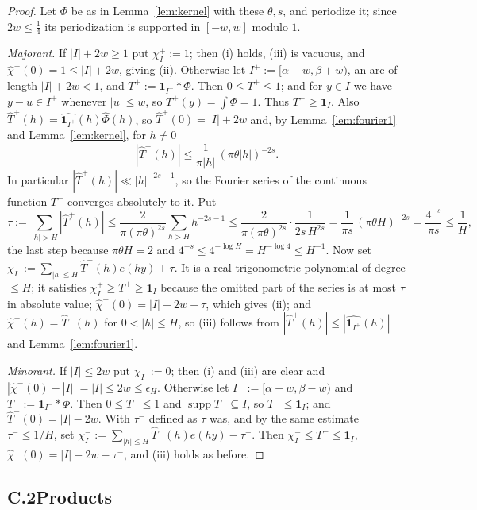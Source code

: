 \documentclass[11pt]{article}
\theoremstyle{definition}
\theoremstyle{plain}
\begin{document}
\begin{proof}
Let $\Phi$ be as in Lemma~\ref{lem:kernel} with these $\theta,s$, and
periodize it; since $2w\le\tfrac14$ its periodization is supported in
$[-w,w]$ modulo $1$.

\emph{Majorant.}  If $|I|+2w\ge1$ put $\chi^{+}_{I}:=1$; then (i) holds,
(iii) is vacuous, and $\hat\chi^{+}(0)=1\le|I|+2w$, giving (ii).
Otherwise let $I^{+}:=[\alpha-w,\beta+w)$, an arc of length $|I|+2w<1$,
and $T^{+}:=\mathbf 1_{I^{+}}*\Phi$.  Then $0\le T^{+}\le1$; and for
$y\in I$ we have $y-u\in I^{+}$ whenever $|u|\le w$, so
$T^{+}(y)=\int\Phi=1$.  Thus $T^{+}\ge\mathbf 1_{I}$.  Also
$\hat T^{+}(h)=\widehat{\mathbf 1_{I^{+}}}(h)\hat\Phi(h)$, so
$\hat T^{+}(0)=|I|+2w$ and, by Lemma~\ref{lem:fourier1} and
Lemma~\ref{lem:kernel}, for $h\ne0$
\[
|\hat T^{+}(h)|\le\frac{1}{\pi|h|}\,(\pi\theta|h|)^{-2s}.
\]
In particular $|\hat T^{+}(h)|\ll|h|^{-2s-1}$, so the Fourier series of
the continuous function $T^{+}$ converges absolutely to it.  Put
\[
\tau:=\sum_{|h|>H}|\hat T^{+}(h)|
\le\frac{2}{\pi(\pi\theta)^{2s}}\sum_{h>H}h^{-2s-1}
\le\frac{2}{\pi(\pi\theta)^{2s}}\cdot\frac{1}{2s\,H^{2s}}
=\frac{1}{\pi s}\,(\pi\theta H)^{-2s}=\frac{4^{-s}}{\pi s}\le\frac1H,
\]
the last step because $\pi\theta H=2$ and
$4^{-s}\le4^{-\log H}=H^{-\log4}\le H^{-1}$.  Now set
$\chi^{+}_{I}:=\sum_{|h|\le H}\hat T^{+}(h)e(hy)+\tau$.  It is a real
trigonometric polynomial of degree $\le H$; it satisfies
$\chi^{+}_{I}\ge T^{+}\ge\mathbf 1_{I}$ because the omitted part of the
series is at most $\tau$ in absolute value; $\hat\chi^{+}(0)=|I|+2w+\tau$,
which gives (ii); and $\hat\chi^{+}(h)=\hat T^{+}(h)$ for $0<|h|\le H$,
so (iii) follows from $|\hat T^{+}(h)|\le|\widehat{\mathbf 1_{I^{+}}}(h)|$
and Lemma~\ref{lem:fourier1}.

\emph{Minorant.}  If $|I|\le2w$ put $\chi^{-}_{I}:=0$; then (i) and (iii)
are clear and $|\hat\chi^{-}(0)-|I||=|I|\le2w\le\epsilon_{H}$.  Otherwise
let $I^{-}:=[\alpha+w,\beta-w)$ and $T^{-}:=\mathbf 1_{I^{-}}*\Phi$.  Then
$0\le T^{-}\le1$ and $\operatorname{supp}T^{-}\subseteq I$, so
$T^{-}\le\mathbf 1_{I}$; and $\hat T^{-}(0)=|I|-2w$.  With $\tau^{-}$
defined as $\tau$ was, and by the same estimate $\tau^{-}\le1/H$, set
$\chi^{-}_{I}:=\sum_{|h|\le H}\hat T^{-}(h)e(hy)-\tau^{-}$.  Then
$\chi^{-}_{I}\le T^{-}\le\mathbf 1_{I}$, $\hat\chi^{-}(0)=|I|-2w-\tau^{-}$,
and (iii) holds as before.
\end{proof}

\subsection*{C.2\quad Products}
\end{document}
